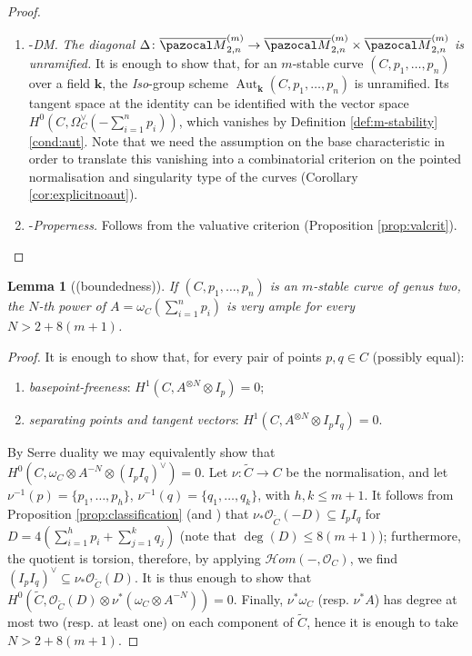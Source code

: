 \documentclass{compositio}
\renewcommand{\k}{\mathbf k}
\newcommand{\OO}{\mathcal O}
\renewcommand{\to}{\rightarrow}
\newcommand{\oM}{\overline{\pazocal M}}
\newcommand{\hhom}{\mathcal{H}\!om}
\theoremstyle{plain}
\newtheorem{lem}[thm]{Lemma}
\theoremstyle{definition}
\theoremstyle{remark}
\begin{document}
\begin{proof}
\begin{enumerate}
  \item-\emph{DM.} \emph{The diagonal $\Delta\colon \oM_{2,n}^{(m)}\to \oM_{2,n}^{(m)}\times\oM_{2,n}^{(m)}$ is unramified.} It is enough to show that, for an $m$-stable curve $(C,p_1,\ldots,p_n)$ over a field $\k$, the \emph{Iso}-group scheme $\operatorname{Aut}_{\k}(C,p_1,\ldots,p_n)$ is unramified. Its tangent space at the identity can be identified with the vector space $H^0(C,\Omega_C^\vee(-\sum_{i=1}^n p_i))$, which vanishes by Definition \ref{def:m-stability}\ref{cond:aut}. Note that we need the assumption on the base characteristic in order to translate this vanishing into a combinatorial criterion on the pointed normalisation and singularity type of the curves (Corollary \ref{cor:explicitnoaut}).
  
  \item-\emph{Properness.} Follows from the valuative criterion (Proposition \ref{prop:valcrit}).
 \end{enumerate}

\end{proof}


\begin{lem}[(boundedness)]\label{lem:boundedness}
 If $(C,p_1,\ldots,p_n)$ is an $m$-stable curve of genus two, the $N$-th power of $A=\omega_C(\sum_{i=1}^np_i)$ is very ample for every $N>2+8(m+1)$.
\end{lem}
\begin{proof}
 It is enough to show that, for every pair of points $p,q\in C$ (possibly equal):
 \begin{enumerate}
  \item \emph{basepoint-freeness}: $H^1(C,A^{\otimes N}\otimes I_p)=0$;
  \item \emph{separating points and tangent vectors}: $H^1(C,A^{\otimes N}\otimes I_pI_q)=0$.
 \end{enumerate}
By Serre duality we may equivalently show that $H^0(C,\omega_C\otimes A^{-N}\otimes(I_pI_q)^\vee)=0$. Let $\nu\colon\tilde C\to C$ be the normalisation, and let $\nu^{-1}(p)=\{p_1,\ldots,p_h\}$, $\nu^{-1}(q)=\{q_1,\ldots,q_k\}$, with $h,k\leq m+1$. It follows from Proposition \ref{prop:classification} (and \cite[Proposition A.3]{SMY1}) that $\nu_*\OO_{\tilde C}(-D)\subseteq I_pI_q$ for $D=4(\sum_{i=1}^hp_i+\sum_{j=1}^kq_j)$ (note that $\deg(D)\leq 8(m+1)$); furthermore, the quotient is torsion, therefore, by applying $\hhom(-,\OO_C)$, we find $(I_pI_q)^\vee\subseteq\nu_*\OO_{\tilde C}(D)$. It is thus enough to show that $H^0(\tilde C,\OO_{\tilde C}(D)\otimes\nu^*(\omega_C\otimes A^{-N}))=0$. Finally, $\nu^*\omega_C$ (resp. $\nu^*A$) has degree at most two (resp. at least one) on each component of $\tilde C$, hence it is enough to take $N>2+8(m+1)$.
\end{proof}
\end{document}

